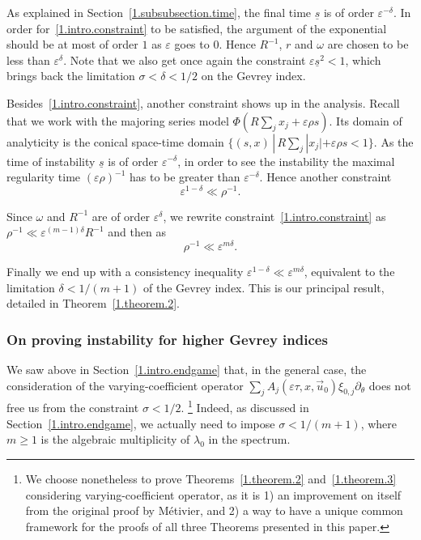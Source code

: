 \documentclass[AHL,Unicode,longabstracts,published]{cedram}
\theoremstyle{plain}
\newcommand*\e{\varepsilon}
\newcommand{\dptl}{\partial}%
\newcommand*\und{\underline}
\begin{document}
As explained in Section~\ref{1.subsubsection.time}, the final time $\und{s}$ is of order $\e^{-\delta}$. In order for~\eqref{1.intro.constraint} to be satisfied, the argument of the exponential should be at most of order $1$ as $\e$ goes to $0$. Hence $R^{-1}$, $r$ and $\omega$ are chosen to be less than $\e^{\delta}$. Note that we also get once again the constraint $\e\und{s}^2 <1$, which brings back the limitation $\sigma < \delta < 1/2$ on the Gevrey index.

Besides~\eqref{1.intro.constraint}, another constraint shows up in the analysis. Recall that we work with the majoring series model $\Phi(R\sum_j x_j + \e\rho s)$. Its domain of analyticity is the conical space-time domain $\{ (s,x) \,|\, R\sum_j |x_j| + \e\rho s < 1 \}$. As the time of instability $\und{s}$ is of order $\e^{-\delta}$, in order to see the instability the maximal regularity time $(\e\rho)^{-1}$ has to be greater than $\e^{-\delta}$. Hence another constraint
\begin{equation}\label{1.intro.constraint.2}
\e^{1 - \delta} \ll \rho^{-1}.
\end{equation}

Since $\omega$ and $R^{-1}$ are of order $\e^{\delta}$, we rewrite constraint~\eqref{1.intro.constraint} as $\rho^{-1} \ll \e^{(m-1)\delta} R^{-1}$ and then as
\[
\rho^{-1} \ll \e^{m\delta}.
\]


Finally we end up with a consistency inequality $\e^{1-\delta} \ll \e^{m\delta}$, equivalent to the limitation $\delta < 1/(m+1)$ of the Gevrey index. This is our principal result, detailed in Theorem~\ref{1.theorem.2}.


\subsubsection{On proving instability for higher Gevrey indices}\label{1.intro.subsection.all.gevrey}

We saw above in Section~\ref{1.intro.endgame} that, in the general case, the consideration of the varying-coefficient operator $ \sum_j A_j(\e \tau,x,\vec{u}_0) \xi_{0,j} \dptl_{\theta} $ does not free us from the constraint $ \sigma < 1/2$.
\footnote{We choose nonetheless to prove Theorems~\ref{1.theorem.2} and~\ref{1.theorem.3} considering varying-coefficient operator, as it is 1) an improvement on itself from the original proof by Métivier, and 2) a way to have a unique common framework for the proofs of all three Theorems presented in this paper.}
Indeed, as discussed in Section~\ref{1.intro.endgame}, we actually need to impose $ \sigma < 1/(m+1)$, where $ m \geq 1$ is the algebraic multiplicity of $\lambda_0$ in the spectrum.
\end{document}

